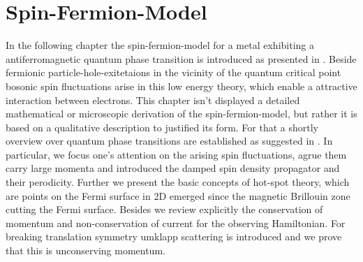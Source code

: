 %
%
%
\chapter{Spin-Fermion-Model}
\label{ch: spin fermion model}
%
%
%
In the following chapter the spin-fermion-model for a metal exhibiting a antiferromagnetic quantum phase transition is introduced as presented in \cite{Abanov&Chubukov&Schmalian}.
Beside fermionic particle-hole-exitetaions in the vicinity of the quantum critical point bosonic spin fluctuations arise in this low energy theory, which enable a attractive interaction between electrons.
This chapter isn't displayed a detailed mathematical or microscopic derivation of the spin-fermion-model, but rather it is based on a qualitative description to justified its form.
For that a shortly overview over quantum phase transitions are established as suggested in \cite{SachdevQCP}.
In particular, we focus one's attention on the arising spin fluctuations, agrue them carry large momenta and introduced the damped spin density propagator and their perodicity.
Further we present the basic concepts of hot-spot theory, which are points on the Fermi surface in 2D emerged since the magnetic Brillouin zone cutting the Fermi surface.
Besides we review explicitly the conservation of momentum and non-conservation of current for the observing Hamiltonian.
For breaking translation symmetry umklapp scattering is introduced and we prove that this is unconserving momentum.
%
%
